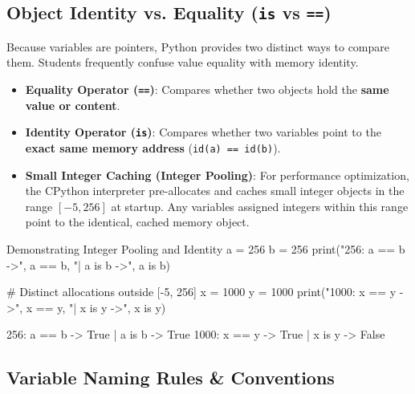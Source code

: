 \subsection{Object Identity vs. Equality (\texttt{is} vs \texttt{==})}

Because variables are pointers, Python provides two distinct ways to compare them. Students frequently confuse value equality with memory identity.
\begin{itemize}[leftmargin=1.5em]
    \item \textbf{Equality Operator (\texttt{==})}: Compares whether two objects hold the \textbf{same value or content}.
    \item \textbf{Identity Operator (\texttt{is})}: Compares whether two variables point to the \textbf{exact same memory address} (\texttt{id(a) == id(b)}).
    \item \textbf{Small Integer Caching (Integer Pooling)}: For performance optimization, the CPython interpreter pre-allocates and caches small integer objects in the range $[-5, 256]$ at startup. Any variables assigned integers within this range point to the identical, cached memory object.
\end{itemize}

\begin{pythoncode}{Demonstrating Integer Pooling and Identity}
a = 256
b = 256
print("256: a == b ->", a == b, "| a is b ->", a is b) 

# Distinct allocations outside [-5, 256]
x = 1000
y = 1000
print("1000: x == y ->", x == y, "| x is y ->", x is y) 
\end{pythoncode}

\begin{outputbox}
256: a == b -> True | a is b -> True
1000: x == y -> True | x is y -> False
\end{outputbox}

\subsection{Variable Naming Rules \& Conventions}

